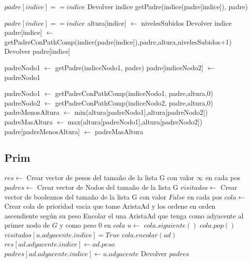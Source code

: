 \documentclass[11pt,a4paper]{article}
\begin{document}
\begin{codebox}
\li \If $padre[indice] == indice$ \Then
		\li Devolver indice
\li \Else
		\li getPadre(indice(padre[indice]), padre)
\li \End
\end{codebox}


\begin{codebox}
\li \If $padre[indice] == indice$ \Then
		\li altura[indice] $\gets$ nivelesSubidos
		\li Devolver indice
	\li \Else
		\li padre[indice] $\gets$ getPadreConPathComp(indice(padre[indice]),padre,altura,nivelesSubidos+1)
		\li Devolver padre[indice]
		\End
\end{codebox}

\begin{codebox}
	\li padreNodo1 $\gets$ getPadre(indiceNodo1, padre)
	\li padre[indiceNodo2] $\gets$ padreNodo1
\end{codebox}

\begin{codebox}
\li padreNodo1 $\gets$ getPadreConPathComp(indiceNodo1, padre,altura,0)
\li padreNodo2 $\gets$ getPadreConPathComp(indiceNodo2, padre,altura,0)
\li padreMenosAltura $\gets$ min(altura[padreNodo1],altura[padreNodo2])
\li padreMasAltura $\gets$ max(altura[padreNodo1],altura[padreNodo2])
\li padre[padreMenosAltura] $\gets$ padreMasAltura
\end{codebox}

\subsection{Prim}

\begin{codebox}
\li $res \gets$ Crear vector de pesos del tamaño de la lista G con valor $\infty$ en cada pos
\li $padres \gets$ Crear vector de Nodos del tamaño de la lista G
\li $visitados \gets$ Crear vector de booleanos del tamaño de la lista G con valor $False$ en cada pos
\li $cola \gets$ Crear cola de prioridad vacia que tome AristaAd 
\zi y los ordene en orden ascendiente según su peso
\li Encolar el una AristaAd que tenga como adyacente al primer nodo de $G$ y como peso $0$ en $cola$
\li {} \Do
\li 	$u \gets$ $cola.siguiente()$
\li 	$cola.pop()$
\li 	$visitados[u.adyacente.indice] = True$
\li 	{} \Do
\li 		{} \Then
			\li $cola.encolar(ad)$
\li 			{} \Then
					\li $res[ad.adyacente.indice] \gets ad.peso$
					\li $padres[ad.adyacente.indice] \gets u.adyacente$
				\End
			 \End
		\End
	\End
\li Devolver $padres$
\end{codebox}
\end{document}
